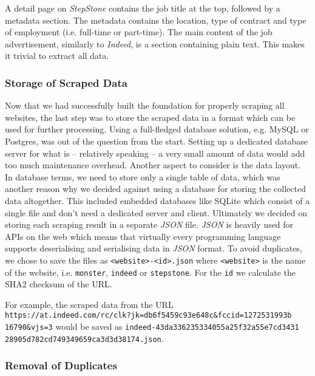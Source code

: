 \documentclass[runningheads]{llncs}
\begin{document}
A detail page on \textit{StepStone} contains the job title at the top, followed by a metadata section. The metadata contains the location, type of contract and type of employment (i.e. full-time or part-time). The main content of the job advertisement, similarly to \textit{Indeed}, is a section containing plain text. This makes it trivial to extract all data.

\subsubsection{Storage of Scraped Data}
\label{subsub:storage_of_scraped_data}

Now that we had successfully built the foundation for properly scraping all websites, the last step was to store the scraped data in a format which can be used for further processing. Using a full-fledged database solution, e.g. MySQL or Postgres, was out of the question from the start. Setting up a dedicated database server for what is -- relatively speaking -- a very small amount of data would add too much maintenance overhead. Another aspect to consider is the data layout.
In database terms, we need to store only a single table of data, which was another reason why we decided against using a database for storing the collected data altogether. This included embedded databases like SQLite which consist of a single file and don't need a dedicated server and client. Ultimately we decided on storing each scraping result in a separate \textit{JSON} file. \textit{JSON} is heavily used for APIs on the web which means that virtually every programming language supports deserialising and serialising data in \textit{JSON} format. To avoid duplicates, we chose to save the files as \texttt{<website>-<id>.json} where \texttt{<website>} is the name of the website, i.e. \texttt{monster}, \texttt{indeed} or \texttt{stepstone}. For the \texttt{id} we calculate the SHA2 checksum of the URL.

For example, the scraped data from the URL \\
\texttt{https://at.indeed.com/rc/clk?jk=db6f5459c93e648c\&fccid=1272531993b\\16790\&vjs=3} would be saved as
\texttt{indeed-43da336235334055a25f32a55e7cd3431\\28905d782cd749349659ca3d3d38174.json}.

\subsubsection{Removal of Duplicates}
\label{subsub:removal_of_duplicates}
\end{document}
